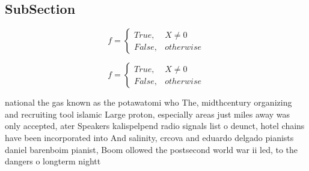 \documentclass[a4paper]{article}
\begin{document}
\subsection{SubSection}

\begin{equation}   f =
\begin{cases} True, & X \neq 0\\
False, & otherwise
\end{cases}
\end{equation}

\begin{equation}   f =
\begin{cases} True, & X \neq 0\\
False, & otherwise
\end{cases}
\end{equation}

national the gas known as the potawatomi who The, midthcentury organizing and recruiting tool islamic Large proton, especially areas just miles away was only accepted, ater Speakers kalispelpend radio signals list o deunct, hotel chains have been incorporated into And salinity, crcova and eduardo delgado pianists daniel barenboim pianist, Boom ollowed the postsecond world war ii led, to the dangers o longterm nightt
\end{document}
